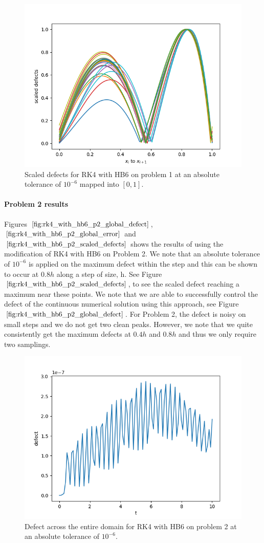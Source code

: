 \begin{figure}[H]
\centering
\includegraphics[width=0.7\linewidth]{./figures/rk4_with_hb6_p1_scaled_defects}
\caption{Scaled defects for RK4 with HB6 on problem 1 at an absolute tolerance of $10^{-6}$ mapped into $[0, 1]$.}
\label{fig:rk4_with_hb6_p1_scaled_defects}
\end{figure}

\paragraph{Problem 2 results}
Figures $\ref{fig:rk4_with_hb6_p2_global_defect}$, $\ref{fig:rk4_with_hb6_p2_global_error}$ and $\ref{fig:rk4_with_hb6_p2_scaled_defects}$ shows the results of using the modification of RK4 with HB6 on Problem 2. We note that an absolute tolerance of $10^{-6}$ is applied on the maximum defect within the step and this can be shown to occur at $0.8h$ along a step of size, h. See Figure $\ref{fig:rk4_with_hb6_p2_scaled_defects}$, to see the scaled defect reaching a maximum near these points. We note that we are able to successfully control the defect of the continuous numerical solution using this approach, see Figure $\ref{fig:rk4_with_hb6_p2_global_defect}$. For Problem 2, the defect is noisy on small steps and we do not get two clean peaks. However, we note that we quite consistently get the maximum defects at $0.4h$ and $0.8h$ and thus we only require two samplings.

\begin{figure}[H]
\centering
\includegraphics[width=0.7\linewidth]{./figures/rk4_with_hb6_p2_global_defect}
\caption{Defect across the entire domain for RK4 with HB6 on problem 2 at an absolute tolerance of $10^{-6}$.}
\label{fig:rk4_with_hb6_p2_global_defect}
\end{figure}

